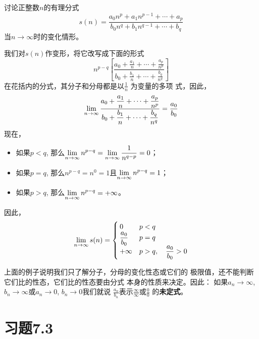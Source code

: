 \begin{example}
    讨论正整数$n$的有理分式
\[s(n)=\frac{a_0n^p+a_1n^{p-1}+\cdots+a_p}{b_0n^q+b_1n^{q-1}+\cdots+b_q}\]
当$n\to\infty$时的变化情形。
\end{example}

\begin{solution}
    我们对$s(n)$作变形，将它改写成下面的形式
\[n^{p-q}\left[\frac{a_0+\frac{a_1}{n}+\cdots+\frac{a_p}{n^p}}{b_0+\frac{b_1}{n}+\cdots+\frac{b_q}{n^q}}\right]\]
在花括内的分式，其分子和分母都是以$\frac{1}{n}$
为变量的多项
式，因此，
\[ \displaystyle\lim_{n\to\infty}\dfrac{a_0+\dfrac{a_1}{n}+\cdots+\dfrac{a_p}{n^p}}{b_0+\dfrac{b_1}{n}+\cdots+\dfrac{b_q}{n^q}}=\dfrac{a_0}{b_0}\]
现在，
\begin{itemize}
    \item 如果$p<q$, 那么$\displaystyle\lim_{n\to\infty}n^{p-q}=\displaystyle\lim_{n\to\infty}\dfrac{1}{n^{q-p}}=0$；
    \item 如果$p=q$, 那么$n^{p-q}=n^0=1$且$\displaystyle\lim_{n\to\infty}n^{p-q}=1$；
    \item 如果$p>q$, 那么$\displaystyle\lim_{n\to\infty}n^{p-q}=+\infty$。
\end{itemize}
因此，
\[ \displaystyle\lim_{n\to\infty} s(n)=\begin{cases}
   0& p<q\\
\dfrac{a_0}{b_0} & p=q\\
+\infty & p>q,\quad \dfrac{a_0}{b_0}>0
\end{cases}\]
\end{solution}

上面的例子说明我们只了解分子，分母的变化性态或它们的
极限值，还不能判断它们比的性态，它们比的性态要由分式
本身的性质来决定。因此：
如果$a_n\to\infty$, $b_n\to\infty$或$a_n\to 0$, $b_n\to 0$我们就说
$\frac{a_n}{b_n}$表示$\frac{\infty}{\infty}$或$\frac{0}{0}$
的\textbf{未定式}。

\section*{习题7.3}

